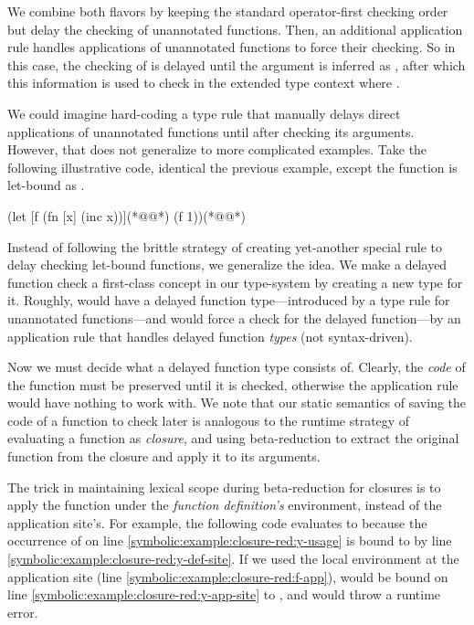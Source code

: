 We combine both flavors by keeping the standard operator-first checking order
but delay the checking of unannotated functions.
Then, an additional application rule handles applications of
unannotated functions to force their checking.
So in this case, the checking of 
is delayed until the argument  is inferred as ,
after which this information is used to check 
in the extended type context where .

We could imagine hard-coding a type rule that manually delays
direct applications of unannotated functions until after checking
its arguments.
However, that does not generalize to more complicated examples.
Take the following illustrative code, identical the previous
example, except the function is let-bound as .

{
\lstset{numbers=left}
\begin{cljlisting}
(let [f (fn [x] (inc x))](*@\label{symbolic:example:let-bound:def-f}@*)
  (f 1))(*@\label{symbolic:example:let-bound:app-f}@*)
\end{cljlisting}
}

Instead of following the brittle strategy of creating yet-another special rule to delay checking
let-bound functions, we generalize the idea.
We make a delayed function check a first-class concept in our type-system by
creating a new type for it.
Roughly,  would have a delayed function type---introduced by
a type rule for unannotated functions---and 
would force a check for the delayed function---by an application
rule that handles delayed function \emph{types} (not syntax-driven).

Now we must decide what a delayed function type consists of.
Clearly, the \emph{code} of the function must be preserved until
it is checked, otherwise the application rule would have nothing
to work with.
We note that our static semantics of saving
the code of a function to check later
is analogous to the runtime strategy of
evaluating a function as \emph{closure},
and using beta-reduction to extract the original
function from the closure and apply it to its arguments.

The trick in maintaining lexical scope during beta-reduction for closures
is to apply the function under the \emph{function definition's}
environment, instead of the application site's.
For example, the following code evaluates
to 
because
the occurrence of
 on line \ref{symbolic:example:closure-red:y-usage}
is bound to  by line \ref{symbolic:example:closure-red:y-def-site}.
If we used the local environment at the application site (line \ref{symbolic:example:closure-red:f-app}),
 would be bound on line \ref{symbolic:example:closure-red:y-app-site}
to ,
and would throw a runtime error.

